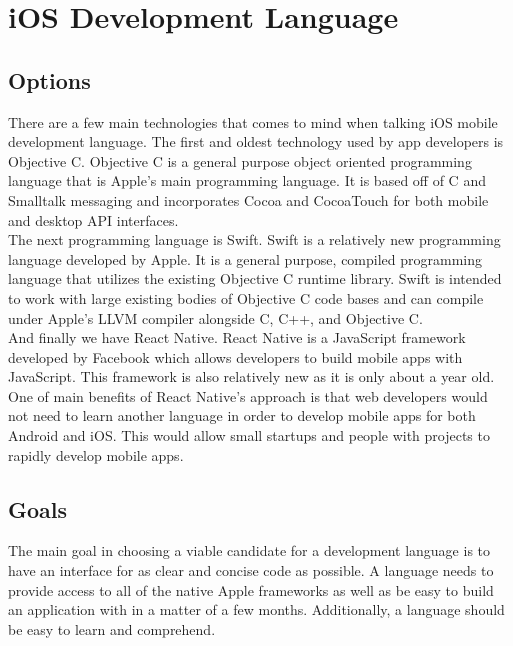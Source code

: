 \documentclass[letterpaper,10pt,titlepage]{article}
\begin{document}
\section{iOS Development Language}

\subsection{Options}

There are a few main technologies that comes to mind when talking iOS mobile development language. The first and oldest technology used by app developers is Objective C. Objective C is a general purpose object oriented programming language that is Apple's main programming language. It is based off of C and Smalltalk messaging and incorporates Cocoa and CocoaTouch for both mobile and desktop API interfaces.\\

The next programming language is Swift. Swift is a relatively new programming language developed by Apple. It is a general purpose, compiled programming language that utilizes the existing Objective C runtime library.\cite{Language} Swift is intended to work with large existing bodies of Objective C code bases and can compile under Apple's LLVM compiler alongside C, C++, and Objective C.\\

And finally we have React Native. React Native is a JavaScript framework developed by Facebook which allows developers to build mobile apps with JavaScript. This framework is also relatively new as it is only about a year old. One of main benefits of React Native's approach is that web developers would not need to learn another language in order to develop mobile apps for both Android and iOS. This would allow small startups and people with projects to rapidly develop mobile apps.

\subsection{Goals}

The main goal in choosing a viable candidate for a development language is to have an interface for as clear and concise code as possible. A language needs to provide access to all of the native Apple frameworks as well as be easy to build an application with in a matter of a few months. Additionally, a language should be easy to learn and comprehend.\\
\end{document}
